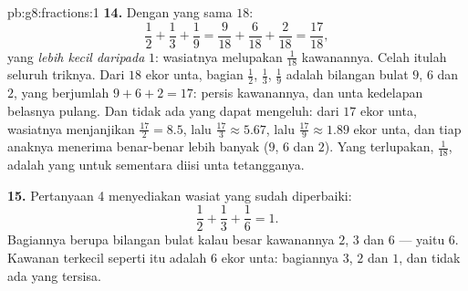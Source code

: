 \begin{solution}{pb:g8:fractions:1}
\textbf{14.} Dengan  yang sama $18$:
\[
\frac12 + \frac13 + \frac19
= \frac{9}{18} + \frac{6}{18} + \frac{2}{18}
= \frac{17}{18} ,
\]
yang \emph{lebih kecil daripada} $1$: wasiatnya melupakan
$\frac{1}{18}$ kawanannya. Celah itulah seluruh triknya. Dari $18$
ekor unta, bagian $\frac12$, $\frac13$, $\frac19$ adalah bilangan
bulat $9$, $6$ dan $2$, yang berjumlah $9 + 6 + 2 = 17$: persis
kawanannya, dan unta kedelapan belasnya pulang. Dan tidak ada yang
dapat mengeluh: dari $17$ ekor unta, wasiatnya menjanjikan
$\frac{17}{2} = 8.5$, lalu $\frac{17}{3} \approx 5.67$, lalu
$\frac{17}{9} \approx 1.89$ ekor unta, dan tiap anaknya menerima
benar-benar lebih banyak ($9$, $6$ dan $2$). Yang terlupakan,
$\frac{1}{18}$, adalah yang untuk sementara diisi unta tetangganya.

\textbf{15.} Pertanyaan 4 menyediakan wasiat yang sudah diperbaiki:
\[
\frac12 + \frac13 + \frac16 = 1 .
\]
Bagiannya berupa bilangan bulat kalau besar kawanannya 
$2$,  $3$ dan  $6$ --- yaitu 
$6$. Kawanan terkecil seperti itu adalah $6$ ekor unta: bagiannya
$3$, $2$ dan $1$, dan tidak ada yang tersisa.

\end{solution}
